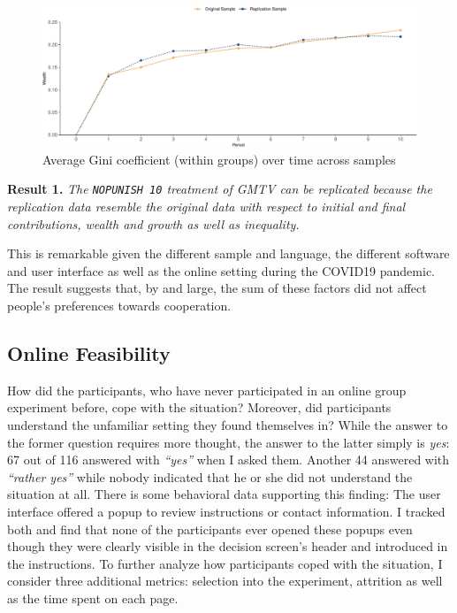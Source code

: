 \documentclass[
  authoryear,
  preprint,
  3p]{elsarticle}
\begin{document}
\begin{figure}

{\centering \includegraphics{paper_files/figure-pdf/fig-gini-time-series-1.pdf}

}

\caption{\label{fig-gini-time-series}Average Gini coefficient (within
groups) over time across samples}

\end{figure}

\textbf{Result 1.} \emph{The \texttt{NOPUNISH\ 10} treatment of GMTV can
be replicated because the replication data resemble the original data
with respect to initial and final contributions, wealth and growth as
well as inequality.}

This is remarkable given the different sample and language, the
different software and user interface as well as the online setting
during the COVID19 pandemic. The result suggests that, by and large, the
sum of these factors did not affect people's preferences towards
cooperation.

\hypertarget{sec-feasibility}{%
\subsection{Online Feasibility}\label{sec-feasibility}}

How did the participants, who have never participated in an online group
experiment before, cope with the situation? Moreover, did participants
understand the unfamiliar setting they found themselves in? While the
answer to the former question requires more thought, the answer to the
latter simply is \emph{yes}: 67 out of 116 answered with \emph{``yes''}
when I asked them. Another 44 answered with \emph{``rather yes''} while
nobody indicated that he or she did not understand the situation at all.
There is some behavioral data supporting this finding: The user
interface offered a popup to review instructions or contact information.
I tracked both and find that none of the participants ever opened these
popups even though they were clearly visible in the decision screen's
header and introduced in the instructions. To further analyze how
participants coped with the situation, I consider three additional
metrics: selection into the experiment, attrition as well as the time
spent on each page.
\end{document}
